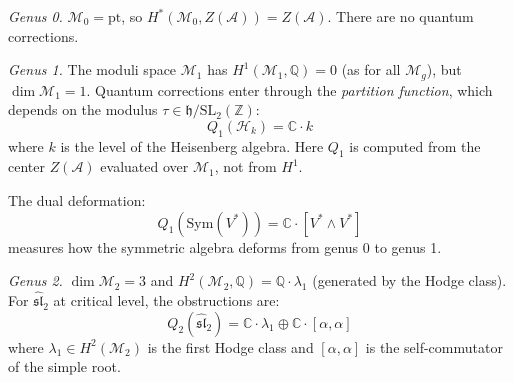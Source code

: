 \begin{remark}\label{rem:explicit-low-genus-curved}

\emph{Genus 0.} $\mathcal{M}_0 = \text{pt}$, so $H^*(\mathcal{M}_0, Z(\mathcal{A}))
= Z(\mathcal{A})$. There are no quantum corrections.

\emph{Genus 1.} The moduli space $\mathcal{M}_1$ has $H^1(\mathcal{M}_1, \mathbb{Q}) = 0$ (as for all $\mathcal{M}_g$), but $\dim \mathcal{M}_1 = 1$. Quantum corrections enter through the \emph{partition function}, which depends on the modulus $\tau \in \mathfrak{h}/\mathrm{SL}_2(\mathbb{Z})$:
\[Q_1(\mathcal{H}_k) = \mathbb{C} \cdot k\]
where $k$ is the level of the Heisenberg algebra. Here $Q_1$ is computed from the center $Z(\mathcal{A})$ evaluated over $\mathcal{M}_1$, not from $H^1$.

The dual deformation:
\[Q_1(\text{Sym}(V^*)) = \mathbb{C} \cdot [V^* \wedge V^*]\]
measures how the symmetric algebra deforms from genus 0 to genus 1.

\emph{Genus 2.} $\dim \mathcal{M}_2 = 3$ and $H^2(\mathcal{M}_2, \mathbb{Q}) = \mathbb{Q} \cdot \lambda_1$ (generated by the Hodge class). For $\widehat{\mathfrak{sl}}_2$ at
critical level, the obstructions are:
\[Q_2(\widehat{\mathfrak{sl}}_2) = \mathbb{C} \cdot \lambda_1 \oplus \mathbb{C} \cdot
[\alpha, \alpha]\]
where $\lambda_1 \in H^2(\mathcal{M}_2)$ is the first Hodge class and $[\alpha, \alpha]$
is the self-commutator of the simple root.
\end{remark}

